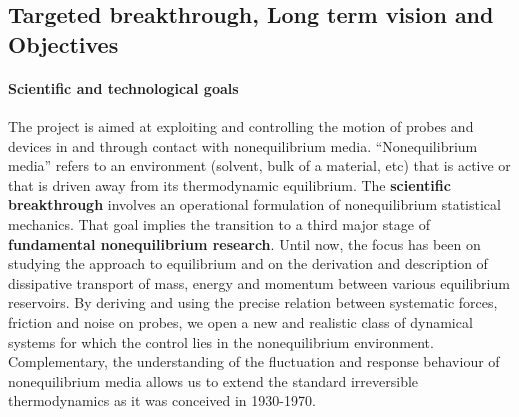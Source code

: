 
\subsection{Targeted breakthrough, Long term vision and Objectives}\label{sec:objectives}


\paragraph{Scientific and technological goals}

The project is aimed at exploiting and controlling the motion of probes and devices in and
through contact with nonequilibrium media. ``Nonequilibrium media'' refers to an environment
(solvent, bulk of a material, etc) that is active or that is driven away from its
thermodynamic equilibrium.
%
The {\bf scientific
  breakthrough} involves an operational formulation of nonequilibrium statistical mechanics.
That goal implies the transition to a third major stage of {\bf fundamental nonequilibrium
  research}. Until now, the focus has been on studying the approach to equilibrium and on
the derivation and description of dissipative transport of mass, energy and momentum between
various equilibrium reservoirs.  By deriving and using the precise relation between
systematic forces, friction and noise on probes, we open a new and realistic class of
dynamical systems for which the control lies in the nonequilibrium environment.
Complementary, the understanding of the fluctuation and response behaviour of nonequilibrium
media allows us to extend the standard irreversible thermodynamics as it was conceived in
1930-1970.

